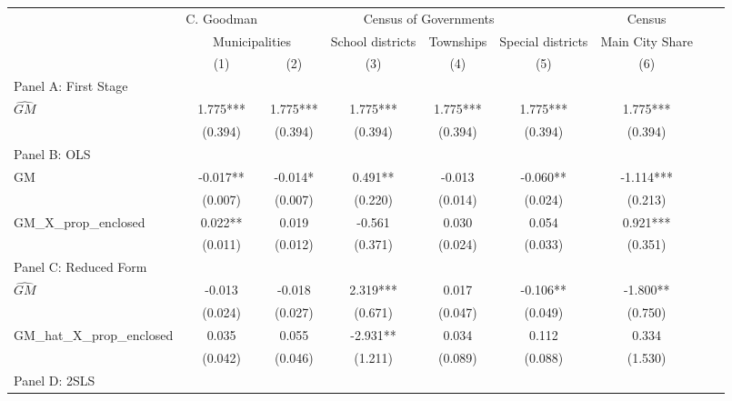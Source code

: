  \begin{tabular}{l*{8}{c}} \toprule
&\multicolumn{1}{c}{C. Goodman}&\multicolumn{4}{c}{Census of Governments}&\multicolumn{1}{c}{Census}\\\cmidrule(lr){2-2}\cmidrule(lr){3-6}\cmidrule(lr){7-7}
&\multicolumn{2}{c}{Municipalities}&\multicolumn{1}{c}{School districts}&\multicolumn{1}{c}{Townships}&\multicolumn{1}{c}{Special districts}&\multicolumn{1}{c}{Main City Share}\\\cmidrule(lr){2-3}\cmidrule(lr){4-6}\cmidrule(lr){7-7}
&\multicolumn{1}{c}{(1)}&\multicolumn{1}{c}{(2)}&\multicolumn{1}{c}{(3)}&\multicolumn{1}{c}{(4)}&\multicolumn{1}{c}{(5)}&\multicolumn{1}{c}{(6)}\\
\cmidrule(lr){1-7}
\multicolumn{6}{l}{Panel A: First Stage}\\
\cmidrule(lr){1-7}
$\widehat{GM}$  &    1.775***&    1.775***&    1.775***&    1.775***&    1.775***&    1.775***\\
                &  (0.394)   &  (0.394)   &  (0.394)   &  (0.394)   &  (0.394)   &  (0.394)   \\
\cmidrule(lr){1-7}
\multicolumn{6}{l}{Panel B: OLS}\\
\cmidrule(lr){1-7}
GM              &   -0.017** &   -0.014*  &    0.491** &   -0.013   &   -0.060** &   -1.114***\\
                &  (0.007)   &  (0.007)   &  (0.220)   &  (0.014)   &  (0.024)   &  (0.213)   \\
\addlinespace
GM\_X\_prop\_enclosed&    0.022** &    0.019   &   -0.561   &    0.030   &    0.054   &    0.921***\\
                &  (0.011)   &  (0.012)   &  (0.371)   &  (0.024)   &  (0.033)   &  (0.351)   \\
\cmidrule(lr){1-7}
\multicolumn{6}{l}{Panel C: Reduced Form}\\
\cmidrule(lr){1-7}
$\widehat{GM}$  &   -0.013   &   -0.018   &    2.319***&    0.017   &   -0.106** &   -1.800** \\
                &  (0.024)   &  (0.027)   &  (0.671)   &  (0.047)   &  (0.049)   &  (0.750)   \\
\addlinespace
GM\_hat\_X\_prop\_enclosed&    0.035   &    0.055   &   -2.931** &    0.034   &    0.112   &    0.334   \\
                &  (0.042)   &  (0.046)   &  (1.211)   &  (0.089)   &  (0.088)   &  (1.530)   \\
\cmidrule(lr){1-7}
\multicolumn{6}{l}{Panel D: 2SLS}\\
\cmidrule(lr){1-7}

\end{tabular}
